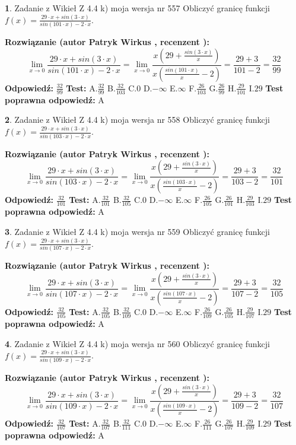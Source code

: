 \documentclass[12pt, a4paper]{article}
\theoremstyle{definition} %
\newtheorem{zad}{}
\newcommand{\zadStart}[1]{\begin{zad}#1\newline}
\newcommand{\zadStop}{\end{zad}}
\newcommand{\rozwStart}[2]{\noindent \textbf{Rozwiązanie (autor #1 , recenzent #2): }\newline}
\newcommand{\rozwStop}{\newline}
\newcommand{\odpStart}{\noindent \textbf{Odpowiedź:}\newline}
\newcommand{\odpStop}{\newline}
\newcommand{\testStart}{\noindent \textbf{Test:}\newline}
\newcommand{\testStop}{\newline}
\newcommand{\kluczStart}{\noindent \textbf{Test poprawna odpowiedź:}\newline}
\newcommand{\kluczStop}{\newline}
\begin{document}
\zadStart{Zadanie z Wikieł Z 4.4 k) moja wersja nr 557}
Obliczyć granicę funkcji $f(x)=\frac{29\cdot x +sin(3\cdot x)}{sin(101\cdot x) -2\cdot x}$.
\zadStop
\rozwStart{Patryk Wirkus}{}
$$\lim\limits_{x\to 0}\frac{29\cdot x +sin(3\cdot x)}{sin(101\cdot x) -2\cdot x}
=\lim\limits_{x\to 0}\frac{x(29+\frac{sin(3\cdot x)}{x})}{x(\frac{sin(101\cdot x)}{x}-2)}
=\frac{29+3}{101-2} = \frac{32}{99}$$
\rozwStop
\odpStart
$\frac{32}{99}$
\odpStop
\testStart
A.$\frac{32}{99}$
B.$\frac{32}{103}$
C.$0$
D.$-\infty$
E.$\infty$
F.$\frac{26}{103}$
G.$\frac{26}{99}$
H.$\frac{29}{101}$
I.$29$
\testStop
\kluczStart
A
\kluczStop



\zadStart{Zadanie z Wikieł Z 4.4 k) moja wersja nr 558}
Obliczyć granicę funkcji $f(x)=\frac{29\cdot x +sin(3\cdot x)}{sin(103\cdot x) -2\cdot x}$.
\zadStop
\rozwStart{Patryk Wirkus}{}
$$\lim\limits_{x\to 0}\frac{29\cdot x +sin(3\cdot x)}{sin(103\cdot x) -2\cdot x}
=\lim\limits_{x\to 0}\frac{x(29+\frac{sin(3\cdot x)}{x})}{x(\frac{sin(103\cdot x)}{x}-2)}
=\frac{29+3}{103-2} = \frac{32}{101}$$
\rozwStop
\odpStart
$\frac{32}{101}$
\odpStop
\testStart
A.$\frac{32}{101}$
B.$\frac{32}{105}$
C.$0$
D.$-\infty$
E.$\infty$
F.$\frac{26}{105}$
G.$\frac{26}{101}$
H.$\frac{29}{103}$
I.$29$
\testStop
\kluczStart
A
\kluczStop



\zadStart{Zadanie z Wikieł Z 4.4 k) moja wersja nr 559}
Obliczyć granicę funkcji $f(x)=\frac{29\cdot x +sin(3\cdot x)}{sin(107\cdot x) -2\cdot x}$.
\zadStop
\rozwStart{Patryk Wirkus}{}
$$\lim\limits_{x\to 0}\frac{29\cdot x +sin(3\cdot x)}{sin(107\cdot x) -2\cdot x}
=\lim\limits_{x\to 0}\frac{x(29+\frac{sin(3\cdot x)}{x})}{x(\frac{sin(107\cdot x)}{x}-2)}
=\frac{29+3}{107-2} = \frac{32}{105}$$
\rozwStop
\odpStart
$\frac{32}{105}$
\odpStop
\testStart
A.$\frac{32}{105}$
B.$\frac{32}{109}$
C.$0$
D.$-\infty$
E.$\infty$
F.$\frac{26}{109}$
G.$\frac{26}{105}$
H.$\frac{29}{107}$
I.$29$
\testStop
\kluczStart
A
\kluczStop



\zadStart{Zadanie z Wikieł Z 4.4 k) moja wersja nr 560}
Obliczyć granicę funkcji $f(x)=\frac{29\cdot x +sin(3\cdot x)}{sin(109\cdot x) -2\cdot x}$.
\zadStop
\rozwStart{Patryk Wirkus}{}
$$\lim\limits_{x\to 0}\frac{29\cdot x +sin(3\cdot x)}{sin(109\cdot x) -2\cdot x}
=\lim\limits_{x\to 0}\frac{x(29+\frac{sin(3\cdot x)}{x})}{x(\frac{sin(109\cdot x)}{x}-2)}
=\frac{29+3}{109-2} = \frac{32}{107}$$
\rozwStop
\odpStart
$\frac{32}{107}$
\odpStop
\testStart
A.$\frac{32}{107}$
B.$\frac{32}{111}$
C.$0$
D.$-\infty$
E.$\infty$
F.$\frac{26}{111}$
G.$\frac{26}{107}$
H.$\frac{29}{109}$
I.$29$
\testStop
\kluczStart
A
\kluczStop
\end{document}
